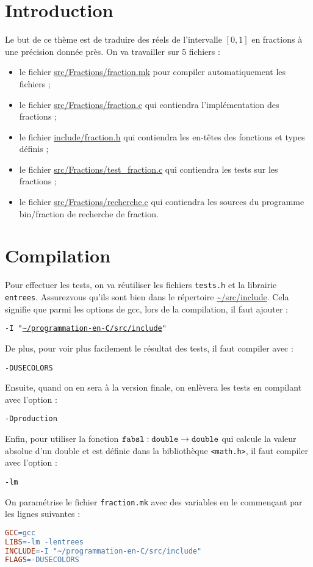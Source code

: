 

\section{Introduction}


Le but de ce thème est de traduire des réels de l’intervalle \([0,
1]\) en fractions à une précision donnée près. On va travailler sur 5
fichiers :
\begin{itemize}
\item le fichier \url{src/Fractions/fraction.mk} pour compiler automatiquement
  les fichiers ;
\item le fichier \url{src/Fractions/fraction.c} qui contiendra
  l’implémentation des fractions ;
\item le fichier \url{include/fraction.h} qui contiendra les en-têtes des
  fonctions et types définis ;
\item le fichier \url{src/Fractions/test_fraction.c} qui contiendra les
  tests sur les fractions ;
\item le fichier \url{src/Fractions/recherche.c} qui contiendra les sources
  du programme bin/fraction de recherche de fraction.
\end{itemize}


\section{Compilation}

Pour effectuer les tests, on va réutiliser les fichiers \texttt{tests.h} et la librairie \texttt{entrees}. Assurezvous qu’ils sont bien dans le répertoire \url{~/src/include}. Cela signifie que parmi les options de
gcc, lors de la compilation, il faut ajouter :
\begin{center}
  \tt -I "\url{~/programmation-en-C/src/include}"
\end{center}
De plus, pour voir plus facilement le résultat des tests, il faut compiler avec :
\begin{center}
  \tt -DUSECOLORS
\end{center}
Ensuite, quand on en sera à la version finale, on enlèvera les tests en compilant avec l’option :
\begin{center}
  \tt -Dproduction
\end{center}
Enfin, pour utiliser la fonction \(\text{\tt fabsl} : \text{\tt
  double} \rightarrow \text{\tt double}\) qui calcule la valeur
absolue d’un double et est définie dans la bibliothèque
\texttt{<math.h>}, il faut compiler avec l’option : 
\begin{center}
  \tt -lm
\end{center}
 On paramétrise
le fichier  \texttt{fraction.mk} avec des variables en le commençant par les lignes
suivantes : 
\begin{lstlisting}[language=make]
GCC=gcc 
LIBS=-lm -lentrees 
INCLUDE=-I "~/programmation-en-C/src/include" 
FLAGS=-DUSECOLORS 
\end{lstlisting}

